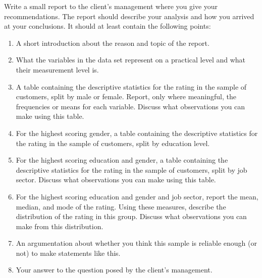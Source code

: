 Write a small report to the client's management where you give your recommendations. The report should describe your analysis and how you arrived at your conclusions. It should at least contain the following points: \\

\begin{enumerate}
    \item A short introduction about the reason and topic of the report.
    \item What the variables in the data set represent on a practical level and what their measurement level is. 
    \item A table containing the descriptive statistics for the rating in the sample of customers, split by male or female. Report, only where meaningful, the frequencies or means for each variable. Discuss what observations you can make using this table. 
    \item For the highest scoring gender, a table containing the descriptive statistics for the rating in the sample of customers, split by education level.
    \item For the highest scoring education and gender, a table containing the descriptive statistics for the rating in the sample of customers, split by job sector. Discuss what observations you can make using this table. 
    \item For the highest scoring education and gender and job sector, report the mean, median, and mode of the rating. Using these measures, describe the distribution of the rating in this group. Discuss what observations you can make from this distribution. 
    \item An argumentation about whether you think this sample is reliable enough (or not) to make statements like this.
    \item Your answer to the question posed by the client's management.
\end{enumerate}

\clearpage %